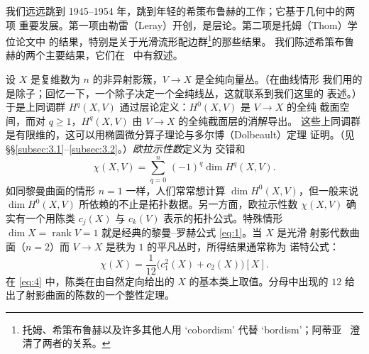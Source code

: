 \documentclass[11pt]{amsart}
\theoremstyle{definition}
\theoremstyle{remark}
\theoremstyle{plain}
\numberwithin{equation}{section}
\renewcommand{\:}{\colon}
\newcommand{\dbar}{{\overline\partial}}
\DeclareMathOperator{\rank}{rank}
\DeclareMathOperator{\Euler}{Euler}
\newcommand{\sO}{\mathcal{O}}
\begin{document}
我们远远跳到 1945–1954 年，跳到年轻的希策布鲁赫的工作；它基于几何中的两项
重要发展。第一项由勒雷（Leray）开创，是层论。第二项是托姆（Thom）学位论文中
的结果，特别是关于光滑流形配边群\footnote{托姆、希策布鲁赫以及许多其他人用
`cobordism' 代替 `bordism'；阿蒂亚~\cite{A10} 澄清了两者的关系。}的那些结果。
我们陈述希策布鲁赫的两个主要结果，它们在~\cite{H1} 中有叙述。


设 $X$ 是复维数为 $n$ 的非异射影簇，$V\to X$ 是全纯向量丛。（在曲线情形
我们用的是除子；回忆一下，一个除子决定一个全纯线丛，这就联系到我们这里的
表述。）于是上同调群 $H^q(X,V)$ 通过层论定义：$H^0(X,V)$ 是 $V\to X$ 的全纯
截面空间，而对 $q\ge1$，$H^q(X,V)$ 由 $V\to X$ 的全纯截面层的消解导出。
这些上同调群是有限维的，这可以用椭圆微分算子理论与多尔博（Dolbeault）定理
证明。（见 \S\S\ref{subsec:3.1}--\ref{subsec:3.2}。）{\it 欧拉示性数}定义为
交错和
  \begin{equation}\label{eq:3}
     \chi (X,V) = \sum\limits_{q=0}^n\, (-1)^q \dim H^q(X,V).
  \end{equation}
如同黎曼曲面的情形 $n=1$ 一样，人们常常想计算 $\dim H^0(X,V)$，但一般来说
$\dim H^0(X,V)$ 所依赖的不止是拓扑数据。另一方面，欧拉示性数 $\chi (X,V)$
确实有一个用陈类 $c_j(X)$ 与 $c_k(V)$ 表示的拓扑公式。特殊情形
$\dim X = \rank V = 1$ 就是经典的黎曼–罗赫公式 \eqref{eq:1}。当 $X$ 是光滑
射影代数曲面（$n=2$）而 $V\to X$ 是秩为 $1$ 的平凡丛时，所得结果通常称为
诺特公式：
  \begin{equation}\label{eq:4}
     \chi (X) = \frac{1}{12}\bigl( c_1^2(X) + c_2(X)\bigr) [X].
  \end{equation}
在 \eqref{eq:4} 中，陈类在由自然定向给出的 $X$ 的基本类上取值。分母中出现的
$12$ 给出了射影曲面的陈数的一个整性定理。


\end{document}

